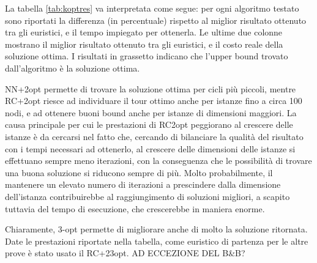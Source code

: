 La tabella \ref{tab:koptres} va interpretata come segue: per ogni algoritmo testato sono riportati la differenza (in percentuale) rispetto al miglior risultato ottenuto tra gli euristici, e il tempo impiegato per ottenerla. Le ultime due colonne mostrano il miglior risultato ottenuto tra gli euristici, e il costo reale della soluzione ottima. I risultati in grassetto indicano che l'upper bound trovato dall'algoritmo è la soluzione ottima.

NN+2opt permette di trovare la soluzione ottima per cicli più piccoli, mentre RC+2opt riesce ad individuare il tour ottimo anche per istanze fino a circa 100 nodi, e ad ottenere buoni bound anche per istanze di dimensioni maggiori. La causa principale per cui le prestazioni di RC2opt peggiorano al crescere delle istanze è da cercarsi nel fatto che, cercando di bilanciare la qualità del risultato con i tempi necessari ad ottenerlo, al crescere delle dimensioni delle istanze si effettuano sempre meno iterazioni, con la conseguenza che le possibilità di trovare una buona soluzione si riducono sempre di più. Molto probabilmente, il mantenere un elevato numero di iterazioni a prescindere dalla dimensione dell’istanza contribuirebbe al raggiungimento di soluzioni migliori, a scapito tuttavia del tempo di esecuzione, che crescerebbe in maniera enorme.

Chiaramente, 3-opt permette di migliorare anche di molto la soluzione ritornata. Date le prestazioni riportate nella tabella, come euristico di partenza per le altre prove è stato usato il RC+23opt. AD ECCEZIONE DEL B\&B?

